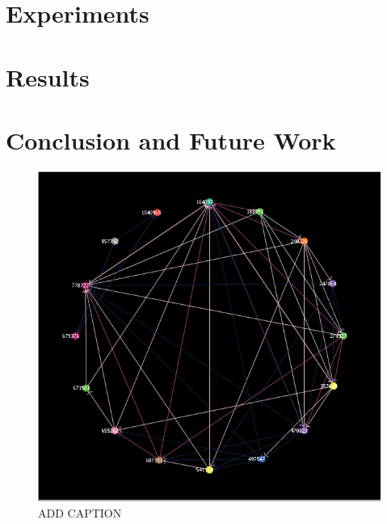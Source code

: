 \documentclass[12pt]{ieeetran} %
\begin{document}
\section{Experiments}

\section{Results}

\section{Conclusion and Future Work}





\begin{figure}
\includegraphics[width=\linewidth]{example_problem}
\caption{ADD CAPTION}
\label{problem}
\end{figure}
\end{document}
